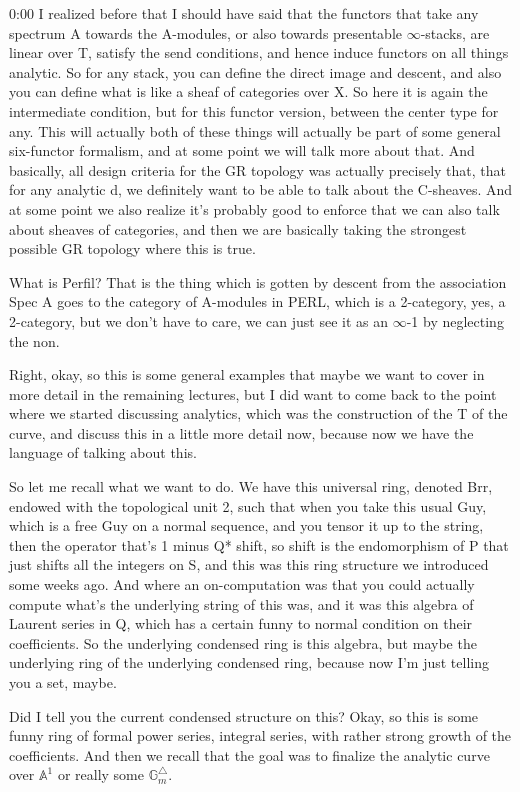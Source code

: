 \begin{unfinished}{0:00}
I realized before that I should have said that the functors that take any spectrum A towards the A-modules, or also towards presentable $\infty$-stacks, are linear over T, satisfy the send conditions, and hence induce functors on all things analytic. So for any stack, you can define the direct image and descent, and also you can define what is like a sheaf of categories over X. So here it is again the intermediate condition, but for this functor version, between the center type for any. This will actually both of these things will actually be part of some general six-functor formalism, and at some point we will talk more about that. And basically, all design criteria for the GR topology was actually precisely that, that for any analytic d, we definitely want to be able to talk about the C-sheaves. And at some point we also realize it's probably good to enforce that we can also talk about sheaves of categories, and then we are basically taking the strongest possible GR topology where this is true.

What is Perfil? That is the thing which is gotten by descent from the association Spec A goes to the category of A-modules in PERL, which is a 2-category, yes, a 2-category, but we don't have to care, we can just see it as an $\infty$-1 by neglecting the non.

Right, okay, so this is some general examples that maybe we want to cover in more detail in the remaining lectures, but I did want to come back to the point where we started discussing analytics, which was the construction of the T of the curve, and discuss this in a little more detail now, because now we have the language of talking about this.

So let me recall what we want to do. We have this universal ring, denoted Brr, endowed with the topological unit 2, such that when you take this usual Guy, which is a free Guy on a normal sequence, and you tensor it up to the string, then the operator that's 1 minus Q* shift, so shift is the endomorphism of P that just shifts all the integers on S, and this was this ring structure we introduced some weeks ago. And where an on-computation was that you could actually compute what's the underlying string of this was, and it was this algebra of Laurent series in Q, which has a certain funny to normal condition on their coefficients. So the underlying condensed ring is this algebra, but maybe the underlying ring of the underlying condensed ring, because now I'm just telling you a set, maybe.


Did I tell you the current condensed structure on this? Okay, so this is some funny ring of formal power series, integral series, with rather strong growth of the coefficients. And then we recall that the goal was to finalize the analytic curve over $\mathbb{A}^1$ or really some $\mathbb{G}_m^\triangle$.


\end{unfinished}
